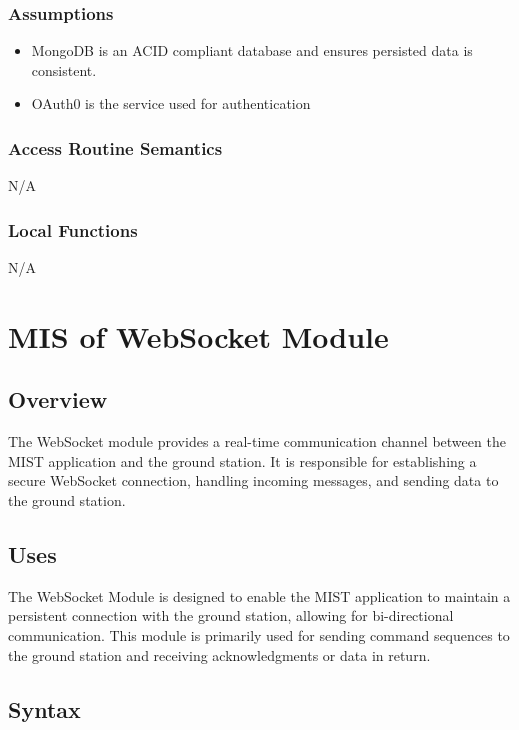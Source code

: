 \documentclass[12pt, titlepage]{article}
\begin{document}
\subsubsection{Assumptions}


\begin{itemize}
    \item MongoDB is an ACID compliant database and ensures persisted data is consistent.
    \item OAuth0 is the service used for authentication
\end{itemize}
 

\subsubsection{Access Routine Semantics}

N/A

\subsubsection{Local Functions}

N/A

\section{MIS of WebSocket Module} \label{Module}

\subsection{Overview}
The WebSocket module provides a real-time communication channel between the MIST application and the ground station. It is responsible for establishing a secure WebSocket connection, handling incoming messages, and sending data to the ground station.

\subsection{Uses}
The WebSocket Module is designed to enable the MIST application to maintain a persistent connection with the ground station, allowing for bi-directional communication. This module is primarily used for sending command sequences to the ground station and receiving acknowledgments or data in return.

\subsection{Syntax}
\end{document}
